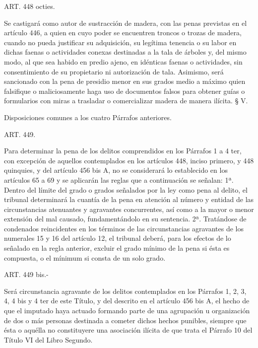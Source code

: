    ART. 448 octies.

    Se castigará como autor de sustracción de madera, con las penas previstas en el artículo 446, a quien en cuyo poder se encuentren troncos o trozas de madera, cuando no pueda justificar su adquisición, su legítima tenencia o su labor en dichas faenas o actividades conexas destinadas a la tala de árboles y, del mismo modo, al que sea habido en predio ajeno, en idénticas faenas o actividades, sin consentimiento de su propietario ni autorización de tala.
    Asimismo, será sancionado con la pena de presidio menor en sus grados medio a máximo quien falsifique o maliciosamente haga uso de documentos falsos para obtener guías o formularios con miras a trasladar o comercializar madera de manera ilícita.
    § V.

    Disposiciones comunes a los cuatro Párrafos anteriores.





   
    ART. 449.

    Para determinar la pena de los delitos comprendidos en los Párrafos 1 a 4 ter, con excepción de aquellos contemplados en los artículos 448, inciso primero, y 448 quinquies, y del artículo 456 bis A, no se considerará lo establecido en los artículos 65 a 69 y se aplicarán las reglas que a continuación se señalan:
    1ª. Dentro del límite del grado o grados señalados por la ley como pena al delito, el tribunal determinará la cuantía de la pena en atención al número y entidad de las circunstancias atenuantes y agravantes concurrentes, así como a la mayor o menor extensión del mal causado, fundamentándolo en su sentencia.
    2ª. Tratándose de condenados reincidentes en los términos de las circunstancias agravantes de los numerales 15 y 16 del artículo 12, el tribunal deberá, para los efectos de lo señalado en la regla anterior, excluir el grado mínimo de la pena si ésta es compuesta, o el mínimum si consta de un solo grado.


    ART. 449 bis.-

    Será circunstancia agravante de los delitos contemplados en los Párrafos 1, 2, 3, 4, 4 bis y 4 ter de este Título, y del descrito en el artículo 456 bis A, el hecho de que el imputado haya actuado formando parte de una agrupación u organización de dos o más personas destinada a cometer dichos hechos punibles, siempre que ésta o aquélla no constituyere una asociación ilícita de que trata el Párrafo 10 del Título VI del Libro Segundo.





